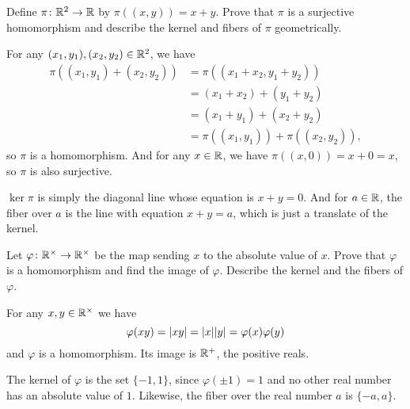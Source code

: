  Define $\pi\colon\mathbb{R}^2\to\mathbb{R}$ by $\pi((x,y)) = x + y$. Prove
that $\pi$ is a surjective homomorphism and describe the kernel and
fibers of $\pi$ geometrically.
\begin{solution}
  For any $(x_1,y_1), (x_2,y_2)\in\mathbb{R}^2$, we have
  \begin{align*}
    \pi((x_1,y_1) + (x_2,y_2))
    &= \pi((x_1 + x_2, y_1 + y_2)) \\
    &= (x_1 + x_2) + (y_1 + y_2) \\
    &= (x_1 + y_1) + (x_2 + y_2) \\
    &= \pi((x_1,y_1)) + \pi((x_2,y_2)),
  \end{align*}
  so $\pi$ is a homomorphism. And for any $x\in\mathbb{R}$, we have
  $\pi((x, 0)) = x + 0 = x$, so $\pi$ is also surjective.

  $\ker\pi$ is simply the diagonal line whose equation is $x + y =
  0$. And for $a\in\mathbb{R}$, the fiber over $a$ is the line with equation
  $x + y = a$, which is just a translate of the kernel.
\end{solution}

 Let $\varphi\colon\mathbb{R}^\times\to\mathbb{R}^\times$ be the map sending
$x$ to the absolute value of $x$. Prove that $\varphi$ is a
homomorphism and find the image of $\varphi$. Describe the kernel and
the fibers of $\varphi$.
\begin{solution}
  For any $x,y\in\mathbb{R}^\times$ we have
  \begin{equation*}
    \varphi(xy) = \lvert{xy}\rvert = \lvert{x}\rvert\lvert{y}\rvert = \varphi(x)\varphi(y)
  \end{equation*}
  and $\varphi$ is a homomorphism. Its image is $\mathbb{R}^+$, the positive
  reals.

  The kernel of $\varphi$ is the set $\{-1,1\}$, since
  $\varphi(\pm1) = 1$ and no other real number has an absolute value
  of $1$. Likewise, the fiber over the real number $a$ is $\{-a, a\}$.
\end{solution}

